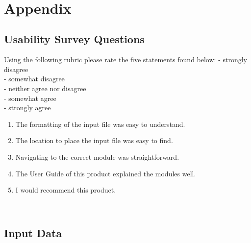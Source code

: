 \documentclass[12pt, titlepage]{article}
\begin{document}
~\newpage


\section{Appendix}


\subsection{Usability Survey Questions} \label{usabilitysurevyquestions}

Using the following rubric please rate the five statements found below:
\linebreak
{} - strongly disagree\\
 - somewhat disagree\\
 - neither agree nor disagree\\
 - somewhat agree\\
 - strongly agree\\

\begin{enumerate}
\item The formatting of the input file was easy to understand.
\item The location to place the input file was easy to find.
\item Navigating to the correct module was straightforward.
\item The User Guide of this product explained the modules well.
\item I would recommend this product.
\end{enumerate}


~\newpage
\subsection{Input Data}
\label{inputdata}
\end{document}
